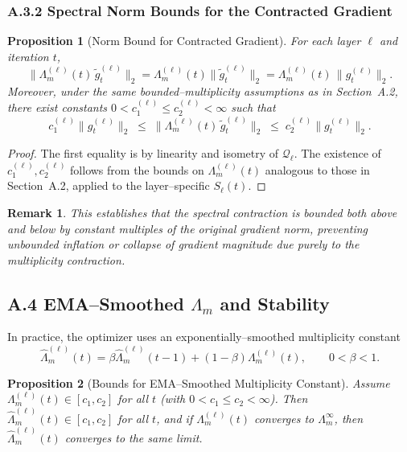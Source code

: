 \documentclass[11pt]{article}
\newtheorem{proposition}{Proposition}
\newtheorem{remark}{Remark}
\begin{document}
\subsubsection*{A.3.2 Spectral Norm Bounds for the Contracted Gradient}

\begin{proposition}[Norm Bound for Contracted Gradient]
For each layer $\ell$ and iteration $t$,
\begin{equation}
  \|\Lambda_m^{(\ell)}(t)\,\tilde g_t^{(\ell)}\|_2
  =
  \Lambda_m^{(\ell)}(t) \|\tilde g_t^{(\ell)}\|_2
  =
  \Lambda_m^{(\ell)}(t)\,\|g_t^{(\ell)}\|_2.
\end{equation}
Moreover, under the same bounded–multiplicity assumptions as in Section~A.2, there exist constants $0<c_1^{(\ell)}\le c_2^{(\ell)}<\infty$ such that
\begin{equation}
  c_1^{(\ell)} \|g_t^{(\ell)}\|_2
  \;\le\;
  \|\Lambda_m^{(\ell)}(t)\,\tilde g_t^{(\ell)}\|_2
  \;\le\;
  c_2^{(\ell)} \|g_t^{(\ell)}\|_2.
\end{equation}
\end{proposition}

\begin{proof}
The first equality is by linearity and isometry of $\mathcal{Q}_\ell$. The existence of $c_1^{(\ell)},c_2^{(\ell)}$ follows from the bounds on $\Lambda_m^{(\ell)}(t)$ analogous to those in Section~A.2, applied to the layer–specific $S_\ell(t)$.
\end{proof}

\begin{remark}
This establishes that the spectral contraction is bounded both above and below by constant multiples of the original gradient norm, preventing unbounded inflation or collapse of gradient magnitude due purely to the multiplicity contraction.
\end{remark}

\subsection*{A.4 EMA–Smoothed $\Lambda_m$ and Stability}

In practice, the optimizer uses an exponentially–smoothed multiplicity constant
\begin{equation}
  \widehat{\Lambda}_m^{(\ell)}(t)
  =
  \beta \widehat{\Lambda}_m^{(\ell)}(t-1)
  + (1-\beta)\Lambda_m^{(\ell)}(t),
  \qquad 0<\beta<1.
\end{equation}

\begin{proposition}[Bounds for EMA–Smoothed Multiplicity Constant]
Assume $\Lambda_m^{(\ell)}(t)\in[c_1,c_2]$ for all $t$ (with $0<c_1\le c_2<\infty$). Then $\widehat{\Lambda}_m^{(\ell)}(t)\in[c_1,c_2]$ for all $t$, and if $\Lambda_m^{(\ell)}(t)$ converges to $\Lambda_m^\infty$, then $\widehat{\Lambda}_m^{(\ell)}(t)$ converges to the same limit.
\end{proposition}
\end{document}
